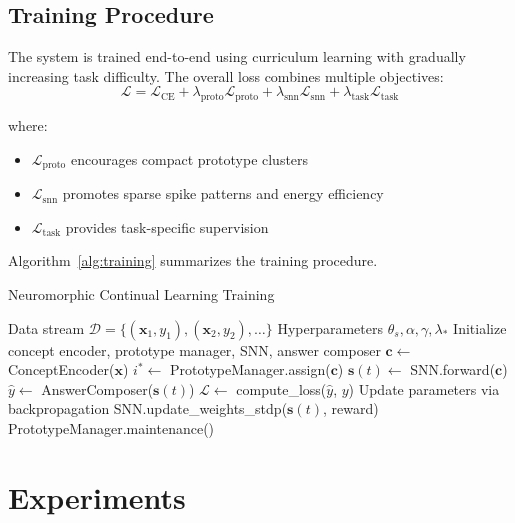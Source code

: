 \documentclass{article}
\begin{document}
\subsection{Training Procedure}

The system is trained end-to-end using curriculum learning with gradually increasing task difficulty. The overall loss combines multiple objectives:
\begin{equation}
\mathcal{L} = \mathcal{L}_{\text{CE}} + \lambda_{\text{proto}} \mathcal{L}_{\text{proto}} + \lambda_{\text{snn}} \mathcal{L}_{\text{snn}} + \lambda_{\text{task}} \mathcal{L}_{\text{task}}
\end{equation}

where:
\begin{itemize}
\item $\mathcal{L}_{\text{proto}}$ encourages compact prototype clusters
\item $\mathcal{L}_{\text{snn}}$ promotes sparse spike patterns and energy efficiency  
\item $\mathcal{L}_{\text{task}}$ provides task-specific supervision
\end{itemize}

Algorithm~\ref{alg:training} summarizes the training procedure.

\begin{algorithm}[t]
\caption{Neuromorphic Continual Learning Training}
\label{alg:training}
\begin{algorithmic}
\REQUIRE Data stream $\mathcal{D} = \{(\mathbf{x}_1, y_1), (\mathbf{x}_2, y_2), \ldots\}$
\REQUIRE Hyperparameters $\theta_s, \alpha, \gamma, \lambda_*$
\STATE Initialize concept encoder, prototype manager, SNN, answer composer
    \STATE $\mathbf{c} \leftarrow$ ConceptEncoder($\mathbf{x}$)
    \STATE $i^* \leftarrow$ PrototypeManager.assign($\mathbf{c}$)
    \STATE $\mathbf{s}(t) \leftarrow$ SNN.forward($\mathbf{c}$)
    \STATE $\hat{y} \leftarrow$ AnswerComposer($\mathbf{s}(t)$)
    \STATE $\mathcal{L} \leftarrow$ compute\_loss($\hat{y}$, $y$)
    \STATE Update parameters via backpropagation
    \STATE SNN.update\_weights\_stdp($\mathbf{s}(t)$, reward)
        \STATE PrototypeManager.maintenance()
    \ENDIF
\ENDFOR
\end{algorithmic}
\end{algorithm}

\section{Experiments}
\label{sec:experiments}
\end{document}
